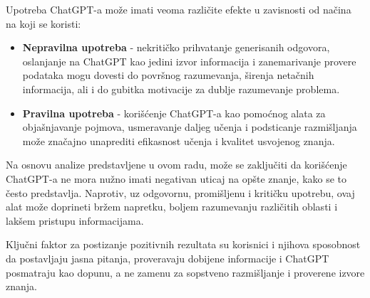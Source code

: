 \documentclass[a4paper, 12pt]{article}
\begin{document}
Upotreba ChatGPT-a može imati veoma različite efekte u zavisnosti od načina na koji se koristi:
\begin{itemize}
    \item \textbf{Nepravilna upotreba} - nekritičko prihvatanje generisanih odgovora, oslanjanje na ChatGPT kao jedini izvor informacija i zanemarivanje provere podataka mogu dovesti do površnog razumevanja, širenja netačnih informacija, ali i do gubitka motivacije za dublje razumevanje problema.
    \item \textbf{Pravilna upotreba} - korišćenje ChatGPT-a kao pomoćnog alata za objašnjavanje pojmova, usmeravanje daljeg učenja i podsticanje razmišljanja može značajno unaprediti efikasnost učenja i kvalitet usvojenog znanja.
\end{itemize}

Na osnovu analize predstavljene u ovom radu, može se zaključiti da korišćenje ChatGPT-a ne mora nužno imati negativan uticaj na opšte znanje, kako se to često predstavlja. Naprotiv, uz odgovornu, promišljenu i kritičku upotrebu, ovaj alat može doprineti bržem napretku, boljem razumevanju različitih oblasti i lakšem pristupu informacijama. 

Ključni faktor za postizanje pozitivnih rezultata su korisnici i njihova sposobnost da postavljaju jasna pitanja, proveravaju dobijene informacije i ChatGPT posmatraju kao dopunu, a ne zamenu za sopstveno
razmišljanje i proverene izvore znanja.


\newpage
\printbibliography
\end{document}
